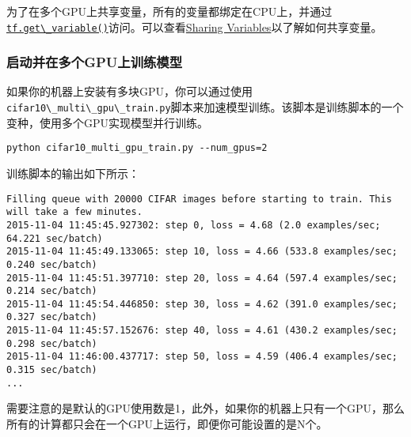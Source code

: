 
为了在多个GPU上共享变量，所有的变量都绑定在CPU上，并通过\href{https://github.com/jikexueyuanwiki/tensorflow-zh/blob/master/SOURCE/api_docs/python/state_ops.md\#get_variable}{\lstinline{tf.get\_variable()}}访问。可以查看\href{https://github.com/jikexueyuanwiki/tensorflow-zh/blob/master/SOURCE/how_tos/variables/index.md}{Sharing
Variables}以了解如何共享变量。

\subsubsection{启动并在多个GPU上训练模型
}\label{ux542fux52a8ux5e76ux5728ux591aux4e2agpuux4e0aux8badux7ec3ux6a21ux578b}

如果你的机器上安装有多块GPU，你可以通过使用\lstinline{cifar10\_multi\_gpu\_train.py}脚本来加速模型训练。该脚本是训练脚本的一个变种，使用多个GPU实现模型并行训练。

\begin{lstlisting}
python cifar10_multi_gpu_train.py --num_gpus=2
\end{lstlisting}

训练脚本的输出如下所示：

\begin{lstlisting}
Filling queue with 20000 CIFAR images before starting to train. This will take a few minutes.
2015-11-04 11:45:45.927302: step 0, loss = 4.68 (2.0 examples/sec; 64.221 sec/batch)
2015-11-04 11:45:49.133065: step 10, loss = 4.66 (533.8 examples/sec; 0.240 sec/batch)
2015-11-04 11:45:51.397710: step 20, loss = 4.64 (597.4 examples/sec; 0.214 sec/batch)
2015-11-04 11:45:54.446850: step 30, loss = 4.62 (391.0 examples/sec; 0.327 sec/batch)
2015-11-04 11:45:57.152676: step 40, loss = 4.61 (430.2 examples/sec; 0.298 sec/batch)
2015-11-04 11:46:00.437717: step 50, loss = 4.59 (406.4 examples/sec; 0.315 sec/batch)
...
\end{lstlisting}

需要注意的是默认的GPU使用数是1，此外，如果你的机器上只有一个GPU，那么所有的计算都只会在一个GPU上运行，即便你可能设置的是N个。

